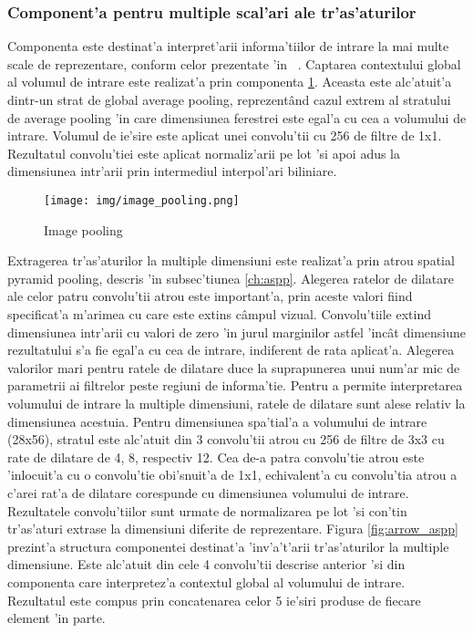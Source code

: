 \documentclass[12pt,a4paper,twoside]{report}
\begin{document}
\subsubsection{Component'a pentru multiple scal'ari ale tr'as'aturilor}
Componenta este destinat'a interpret'arii informa'tiilor de intrare la mai multe scale de reprezentare, conform celor prezentate 'in  ~\cite{DeepLabV3}. Captarea contextului global al volumul de intrare este realizat'a prin componenta \ref{fig:image_pooling}. Aceasta este alc'atuit'a dintr-un strat de global average pooling, reprezent\^and cazul extrem al stratului de average pooling 'in care dimensiunea ferestrei este egal'a cu cea a volumului de intrare. Volumul de ie'sire este aplicat unei convolu'tii cu 256 de filtre de 1x1. Rezultatul convolu'tiei este aplicat normaliz'arii pe lot 'si apoi adus la dimensiunea intr'arii prin intermediul interpol'ari biliniare. 

\begin{figure}[H]
  \texttt{[image: img/image\_pooling.png]}
  \centering
  \caption{Image pooling}
  \label{fig:image_pooling}
\end{figure}

Extragerea tr'as'aturilor la multiple dimensiuni este realizat'a prin atrou spatial pyramid pooling, descris 'in subsec'tiunea \ref{ch:aspp}. Alegerea ratelor de dilatare ale celor patru convolu'tii atrou este important'a, prin aceste valori fiind specificat'a m'arimea cu care este extins c\^ampul vizual. Convolu'tiile extind dimensiunea intr'arii cu valori de zero 'in jurul marginilor astfel 'inc\^at dimensiune rezultatului s'a fie egal'a cu cea de intrare, indiferent de rata aplicat'a. Alegerea valorilor mari pentru ratele de dilatare duce la suprapunerea unui num'ar mic de parametrii ai filtrelor peste regiuni de informa'tie. Pentru a permite interpretarea volumului de intrare la multiple dimensiuni, ratele de dilatare sunt alese relativ la dimensiunea acestuia. Pentru dimensiunea spa'tial'a a volumului de intrare (28x56), stratul este alc'atuit din 3 convolu'tii atrou cu 256 de filtre de 3x3 cu rate de dilatare de 4, 8, respectiv 12. Cea de-a patra convolu'tie atrou este 'inlocuit'a cu o convolu'tie obi'snuit'a de 1x1, echivalent'a cu convolu'tia atrou a c'arei rat'a de dilatare corespunde cu dimensiunea volumului de intrare. Rezultatele convolu'tiilor sunt urmate de normalizarea pe lot 'si con'tin tr'as'aturi extrase la dimensiuni diferite de reprezentare. Figura \ref{fig:arrow_aspp} prezint'a structura componentei destinat'a 'inv'a't'arii tr'as'aturilor la multiple dimensiune. Este alc'atuit din cele 4 convolu'tii descrise anterior 'si din componenta care interpretez'a contextul global al volumului de intrare. Rezultatul este compus prin concatenarea celor 5 ie'siri produse de fiecare element 'in parte.
\end{document}
